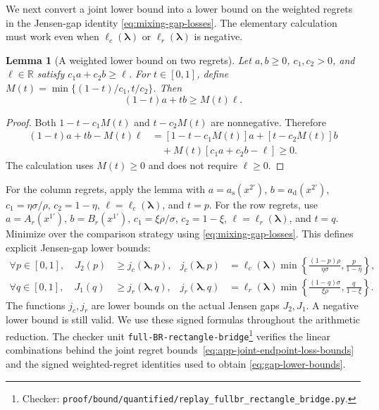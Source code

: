 \documentclass[11pt]{article}
\newtheorem{lemma}[theorem]{Lemma}
\theoremstyle{remark}
\theoremstyle{plain}
\begin{document}
We next convert a joint lower bound into a lower bound on the
weighted regrets in the Jensen-gap identity
\eqref{eq:mixing-gap-losses}. The elementary calculation must work
even when $\ell_c(\boldsymbol\lambda)$ or $\ell_r(\boldsymbol\lambda)$ is negative.

\begin{lemma}[A weighted lower bound on two regrets]
\label{lem:app-weighted-losses}
Let $a,b\ge0$, $c_1,c_2>0$, and $\ell\in\mathbb R$ satisfy
$c_1a+c_2b\ge\ell$. For $t\in[0,1]$, define
$M(t)=\min\{(1-t)/c_1,t/c_2\}$. Then
\[
 (1-t)a+tb\ge M(t)\ell.
\]
\end{lemma}
\begin{proof}
Both $1-t-c_1M(t)$ and $t-c_2M(t)$ are nonnegative. Therefore
\begin{equation}
 \begin{aligned}
 (1-t)a+tb-M(t)\ell
  &=[1-t-c_1M(t)]a+[t-c_2M(t)]b\\
  &\quad+M(t)[c_1a+c_2b-\ell]\ge0.
 \end{aligned}
 \label{eq:app-weighted-loss-identity}
\end{equation}
The calculation uses $M(t)\ge0$ and does not require $\ell\ge0$.
\end{proof}

For the column regrets, apply the lemma with
$a=a_{\mathrm s}(x^{2\prime})$, $b=a_{\mathrm d}(x^{2\prime})$,
$c_1=\eta\sigma/\rho$, $c_2=1-\eta$, $\ell=\ell_c(\boldsymbol\lambda)$,
and $t=p$. For the row regrets, use
$a=A_r(x^{1\prime})$, $b=B_r(x^{1\prime})$,
$c_1=\xi\rho/\sigma$, $c_2=1-\xi$, $\ell=\ell_r(\boldsymbol\lambda)$,
and $t=q$. Minimize over the comparison strategy using
\eqref{eq:mixing-gap-losses}. This defines explicit Jensen-gap lower bounds:
\begin{equation}
 \begin{aligned}
 \forall p\in[0,1],\quad J_2(p)&\ge j_c(\boldsymbol\lambda,p),&
 j_c(\boldsymbol\lambda,p)&=\ell_c(\boldsymbol\lambda)
       \min\left\{\frac{(1-p)\rho}{\eta\sigma},\frac p{1-\eta}\right\},\\
 \forall q\in[0,1],\quad J_1(q)&\ge j_r(\boldsymbol\lambda,q),&
 j_r(\boldsymbol\lambda,q)&=\ell_r(\boldsymbol\lambda)
       \min\left\{\frac{(1-q)\sigma}{\xi\rho},\frac q{1-\xi}\right\}.
 \end{aligned}
 \label{eq:gap-lower-bounds}
\end{equation}
The functions $j_c,j_r$ are lower bounds on the actual Jensen gaps $J_2,J_1$.
A negative lower bound is still valid. We use these signed formulas
throughout the arithmetic reduction. The checker unit
\nolinkurl{full-BR-rectangle-bridge}\footnote{Checker:
\nolinkurl{proof/bound/quantified/replay_fullbr_rectangle_bridge.py}.\label{fn:checker-full-BR-rectangle-bridge}} verifies the linear
combinations behind the joint regret
bounds~\eqref{eq:app-joint-endpoint-loss-bounds} and the signed
weighted-regret identities used to obtain
\eqref{eq:gap-lower-bounds}.
\end{document}
